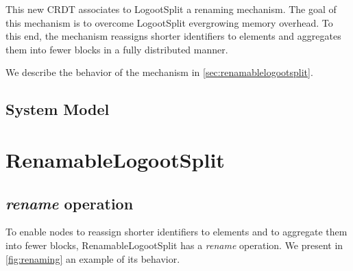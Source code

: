 \documentclass[sigplan,10pt]{acmart}
\begin{document}
This new \ac{CRDT} associates to LogootSplit a renaming mechanism.
The goal of this mechanism is to overcome LogootSplit evergrowing memory overhead.
To this end, the mechanism reassigns shorter identifiers to elements and aggregates them into fewer blocks in a fully distributed manner.

We describe the behavior of the mechanism in \autoref{sec:renamablelogootsplit}.

\subsection{System Model}


\section{RenamableLogootSplit}
\label{sec:renamablelogootsplit}

\subsection{\emph{rename} operation}

To enable nodes to reassign shorter identifiers to elements and to aggregate them into fewer blocks, RenamableLogootSplit has a \emph{rename} operation.
We present in \autoref{fig:renaming} an example of its behavior.
\end{document}
